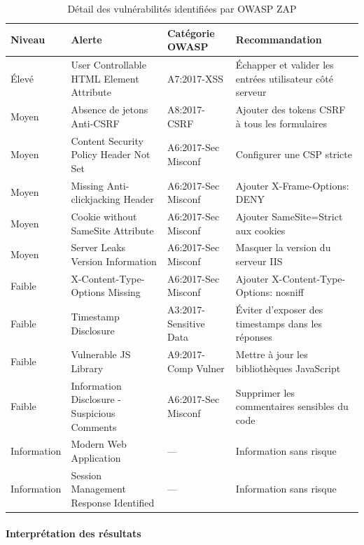 \documentclass[12pt,a4paper,oneside]{report}
\begin{document}
\begin{table}[H]
	\centering
	\small
	\caption{Détail des vulnérabilités identifiées par OWASP ZAP}
	\begin{tabularx}{\textwidth}{|p{2cm}|p{3.5cm}|p{2.2cm}|X|}
		\hline
		\textbf{Niveau} & \textbf{Alerte} & \textbf{Catégorie OWASP} & \textbf{Recommandation} \\
		\hline
		Élevé & User Controllable HTML Element Attribute & A7:2017-XSS & Échapper et valider les entrées utilisateur côté serveur \\
		\hline
		Moyen & Absence de jetons Anti-CSRF & A8:2017-CSRF & Ajouter des tokens CSRF à tous les formulaires \\
		\hline
		Moyen & Content Security Policy Header Not Set & A6:2017-Sec Misconf & Configurer une CSP stricte \\
		\hline
		Moyen & Missing Anti-clickjacking Header & A6:2017-Sec Misconf & Ajouter X-Frame-Options: DENY \\
		\hline
		Moyen & Cookie without SameSite Attribute & A6:2017-Sec Misconf & Ajouter SameSite=Strict aux cookies \\
		\hline
		Moyen & Server Leaks Version Information & A6:2017-Sec Misconf & Masquer la version du serveur IIS \\
		\hline
		Faible & X-Content-Type-Options Missing & A6:2017-Sec Misconf & Ajouter X-Content-Type-Options: nosniff \\
		\hline
		Faible & Timestamp Disclosure & A3:2017-Sensitive Data & Éviter d'exposer des timestamps dans les réponses \\
		\hline
		Faible & Vulnerable JS Library & A9:2017-Comp Vulner & Mettre à jour les bibliothèques JavaScript \\
		\hline
		Faible & Information Disclosure - Suspicious Comments & A6:2017-Sec Misconf & Supprimer les commentaires sensibles du code \\
		\hline
		Information & Modern Web Application & — & Information sans risque \\
		\hline
		Information & Session Management Response Identified & — & Information sans risque \\
		\hline
	\end{tabularx}
	\label{tab:zap_detail}
\end{table}
\paragraph{Interprétation des résultats}
\end{document}
